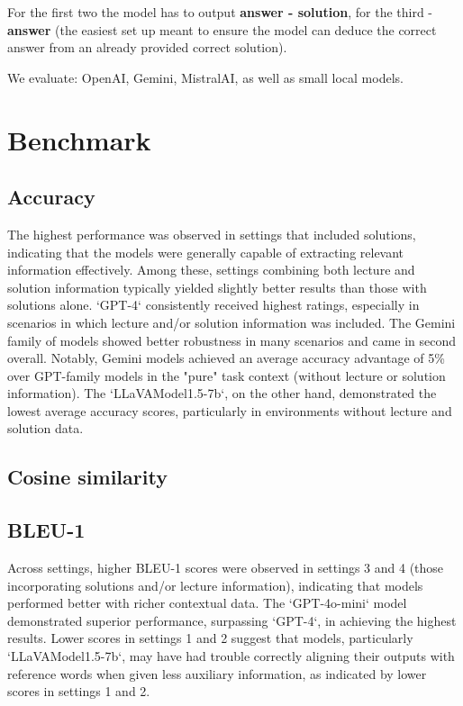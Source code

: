\documentclass[10pt]{article}
\begin{document}
For the first two the model has to output \textbf{answer - solution}, for the third - \textbf{answer} (the easiest set up meant to ensure the model can deduce the correct answer from an already provided correct solution). 

We evaluate: OpenAI, Gemini, MistralAI, as well as small local models. %

\section{Benchmark}
\subsection{Accuracy}
The highest performance was observed in settings that included solutions, indicating that the models were generally capable of extracting relevant information effectively. Among these, settings combining both lecture and solution information typically yielded slightly better results than those with solutions alone. `GPT-4` consistently received highest ratings, especially in scenarios in which lecture and/or solution information was included. The Gemini family of models showed better robustness in many scenarios and came in second overall. Notably, Gemini models achieved an average accuracy advantage of 5\% over GPT-family models in the "pure" task context (without lecture or solution information). The `LLaVAModel1.5-7b`, on the other hand, demonstrated the lowest average accuracy scores, particularly in environments without lecture and solution data.

\subsection{Cosine similarity}
\subsection{BLEU-1}
Across settings, higher BLEU-1 scores were observed in settings 3 and 4 (those incorporating solutions and/or lecture information), indicating that models performed better with richer contextual data. The `GPT-4o-mini` model demonstrated superior performance, surpassing `GPT-4`, in achieving the highest results. Lower scores in settings 1 and 2 suggest that models, particularly `LLaVAModel1.5-7b`, may have had trouble correctly aligning their outputs with reference words when given less auxiliary information, as indicated by lower scores in settings 1 and 2. 
\end{document}
